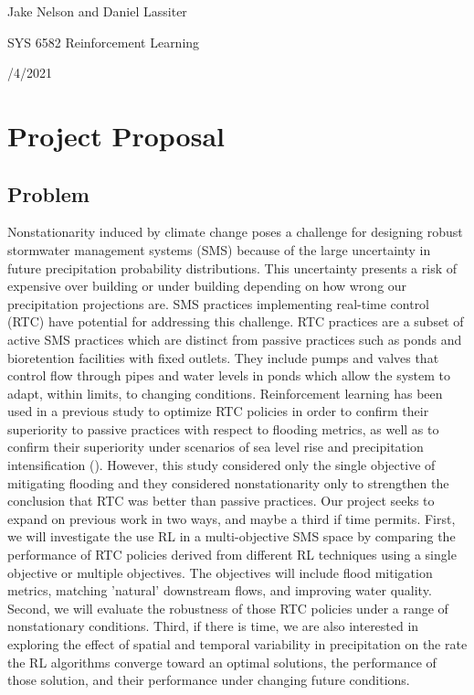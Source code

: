 \documentclass[11pt,a4paper]{article}
\begin{document}
\noindent 
Jake Nelson and Daniel Lassiter

\noindent 
SYS 6582 Reinforcement Learning

/4/2021

\section*{Project Proposal}


\subsection*{Problem}
Nonstationarity induced by climate change poses a challenge for designing robust stormwater management systems (SMS) because of the large uncertainty in future precipitation probability distributions. This uncertainty presents a risk of expensive over building or under building depending on how wrong our precipitation projections are. SMS practices implementing real-time control (RTC) have potential for addressing this challenge. RTC practices are a subset of active SMS practices which are distinct from passive practices such as ponds and bioretention facilities with fixed outlets. They include pumps and valves that control flow through pipes and water levels in ponds which allow the system to adapt, within limits, to changing conditions. Reinforcement learning has been used in a previous study to optimize RTC policies in order to confirm their superiority to passive practices with respect to flooding metrics, as well as to confirm their superiority under scenarios of sea level rise and precipitation intensification (\cite{bowes2020joh}). However, this study considered only the single objective of mitigating flooding and they considered nonstationarity only to strengthen the conclusion that RTC was better than passive practices. Our project seeks to expand on previous work in two ways, and maybe a third if time permits. First, we will investigate the use RL in a multi-objective SMS space by comparing the performance of RTC policies derived from different RL techniques using a single objective or multiple objectives. The objectives will include flood mitigation metrics, matching 'natural' downstream flows, and improving water quality. Second, we will evaluate the robustness of those RTC policies under a range of nonstationary conditions. Third, if there is time, we are also interested in exploring the effect of spatial and temporal variability in precipitation on the rate the RL algorithms converge toward an optimal solutions, the performance of those solution, and their performance under changing future conditions.
\end{document}
